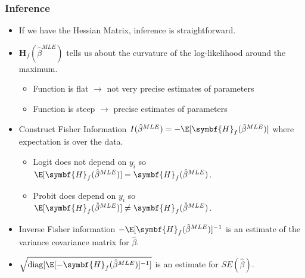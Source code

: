 \documentclass[aspectratio=169,11pt]{beamer}
\begin{document}



\begin{frame}
\frametitle{Inference}
\begin{itemize} 
\item If we have the Hessian Matrix, inference is straightforward.
\item $\symbf{H}_f(\hat{\beta}^{MLE})$ tells us about the \alert{curvature} of the log-likelihood around the maximum.
\begin{itemize}
\item Function is flat $\rightarrow$ not very precise estimates of parameters
\item Function is steep $\rightarrow$  precise estimates of parameters
\end{itemize}
\item Construct \alert{Fisher Information} $I(\hat{\beta}^{MLE}) = -\E[\symbf{H}_f(\hat{\beta}^{MLE})]$ where expectation is over the data.
\begin{itemize}
\item Logit does not depend on $y_i$ so $\E[\symbf{H}_f(\hat{\beta}^{MLE})]=\symbf{H}_f(\hat{\beta}^{MLE})$.
\item Probit does depend on $y_i$ so $\E[\symbf{H}_f(\hat{\beta}^{MLE})]\neq \symbf{H}_f(\hat{\beta}^{MLE})$.
\end{itemize}
\item Inverse Fisher information $-\E[\symbf{H}_f(\hat{\beta}^{MLE})]^{-1}$ is an estimate of the variance covariance matrix for $\hat{\beta}$.
\item $\sqrt{\text{diag}[\E[-\symbf{H}_f(\hat{\beta}^{MLE})]^{-1}]}$ is an estimate for $SE(\hat{\beta})$.
\end{itemize}
\end{frame}
\end{document}
